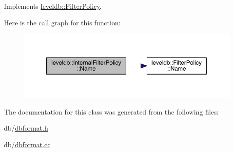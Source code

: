 Implements \mbox{\hyperlink{classleveldb_1_1_filter_policy_afd5e951892a2e740f186c0658913ea1b}{leveldb\+::\+Filter\+Policy}}.

Here is the call graph for this function\+:
\nopagebreak
\begin{figure}[H]
\begin{center}
\leavevmode
\includegraphics[width=350pt]{classleveldb_1_1_internal_filter_policy_aea56a32a2be2ad99f41c2009af823b44_cgraph}
\end{center}
\end{figure}


The documentation for this class was generated from the following files\+:\begin{DoxyCompactItemize}
\item 
db/\mbox{\hyperlink{dbformat_8h}{dbformat.\+h}}\item 
db/\mbox{\hyperlink{dbformat_8cc}{dbformat.\+cc}}\end{DoxyCompactItemize}
